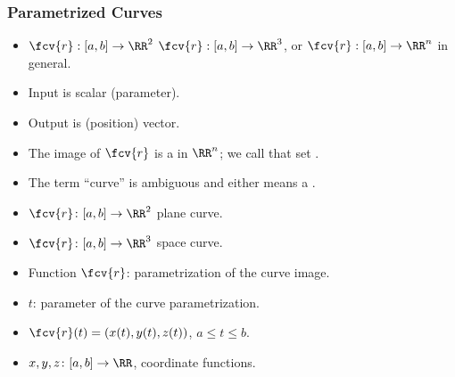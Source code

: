 \begin{frame}
\frametitle{Parametrized Curves}
\begin{itemize}
\item {} $\fcv{r}: [a,b] \to \RR^2$ $\fcv{r}:[a,b]\to \RR^{3}$, or $\fcv{r}:[a,b]\to\RR^{n}  $ in general.
\item<2-> Input is scalar (parameter).
\item<3-> Output is (position) vector.
\item<4-> The image of $\fcv{r}$ is a  in $\RR^{n}$; we call that set .
\item<5-> The term ``curve'' is ambiguous and either means a .
\item<6-> $\fcv{r} \colon [a,b] \to \RR^2$ plane curve.
\item<7-> $\fcv{r} \colon [a,b] \to \RR^3$ space curve.
\item<8-> Function $\fcv{r}$: parametrization of the curve image.
\item<9-> $t$: parameter of the curve parametrization.
\item<10-> $\fcv{r}(t) = ( x(t), y(t), z(t))$, $a \leq t \leq b$.
\item<11-> $x,y,z \colon [a,b] \to \RR$, coordinate functions.
\end{itemize}
\end{frame}
